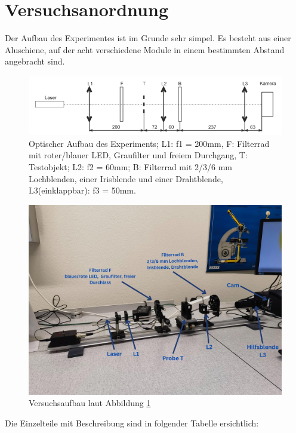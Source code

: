 \documentclass[12pt,a4paper,twoside]{article}
\begin{document}
    

\section{Versuchsanordnung} %

Der Aufbau des Experimentes ist im Grunde sehr simpel. Es besteht aus einer Aluschiene, auf der acht verschiedene Module in einem bestimmten Abstand angebracht sind. 

\begin{figure}[H]
    \centering
    \includegraphics[width=0.8\linewidth]{nudes/VersuchsaufbauTheoretisch.png}
    \caption{Optischer Aufbau des Experiments; L1: f1 = 200mm, F: Filterrad mit roter/blauer LED, Graufilter und freiem
    Durchgang, T: Testobjekt; L2: f2 = 60mm; B: Filterrad mit 2/3/6 mm Lochblenden, einer Irisblende und einer
    Drahtblende, L3(einklappbar): f3 = 50mm. \cite{teachcenter2}}
    \label{fig:VersuchsaufbauTheoretisch}
\end{figure}

\begin{figure}[H]
    \centering
    \includegraphics[width=0.7\linewidth]{nudes/VersuchsaufbauIRLbeschriftet.jpg}
    \caption{Versuchsaufbau laut Abbildung \ref{fig:VersuchsaufbauTheoretisch}}
    \label{fig:Versuchsaufbau}
\end{figure}

Die Einzelteile mit Beschreibung sind in folgender Tabelle ersichtlich:
\end{document}
